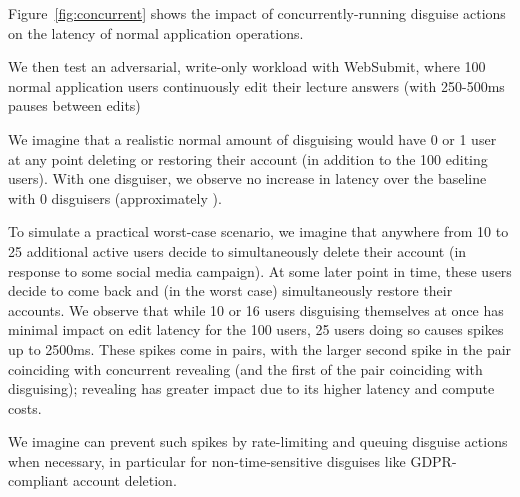 
Figure~\ref{fig:concurrent} shows the impact of concurrently-running disguise actions on the latency
of normal application operations.

We then test an adversarial, write-only workload with WebSubmit, where 100 normal application users
continuously edit their lecture answers (with 250-500ms pauses between edits) 

We imagine that a realistic normal amount of disguising would have 0 or 1 user at any point deleting
or restoring their account (in addition to the 100 editing users). With one disguiser, we observe no
increase in latency over the baseline with 0 disguisers (approximately ). 

To simulate a practical worst-case scenario, we imagine that anywhere from 10 to 25 additional
active users decide to simultaneously delete their account (\eg in response to some social media
campaign). At some later point in time, these users decide to come back and (in the worst case)
simultaneously restore their accounts. We observe that while 10 or 16 users disguising themselves at once
has minimal impact on edit latency for the 100 users, 25 users doing so causes spikes up to 2500ms.  
%
These spikes come in pairs, with the larger second spike in the pair coinciding with concurrent
revealing (and the first of the pair coinciding with disguising); revealing has greater impact due
to its higher latency and compute costs.

We imagine \sys can prevent such spikes by rate-limiting and queuing disguise actions when
necessary, in particular for non-time-sensitive disguises like GDPR-compliant account deletion.


